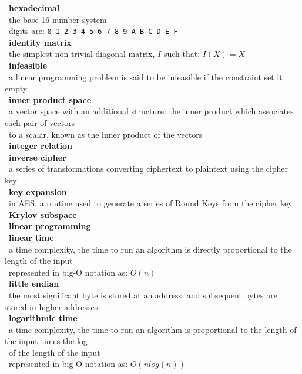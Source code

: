 \documentclass[10pt,letterpaper]{scrartcl}
\newcommand{\tbul}{\textbullet}
\newcommand{\tend}{\>\textendash}
\begin{document}
\begin{tabbing}
\tbul\ \textbf{hexadecimal} \\
    \tend\ the base-16 number system \\
    \tend\ digits are: \texttt{0 1 2 3 4 5 6 7 8 9 A B C D E F} \\
\tbul\ \textbf{identity matrix} \\
    \tend\ the simplest non-trivial diagonal matrix, $I$ such that: $I(X)=X$ \\
\tbul\ \textbf{infeasible} \\
    \tend\ a linear programming problem is said to be infeasible if the constraint set it empty \\
\tbul\ \textbf{inner product space} \\
    \tend\ a vector space with an additional structure: the inner product which associates each pair of vectors \\ \>\ to a scalar, known as the inner product of the vectors \\
\tbul\ \textbf{integer relation} \\
\tbul\ \textbf{inverse cipher} \\
    \tend\ a series of transformations converting ciphertext to plaintext using the cipher key \\
\tbul\ \textbf{key expansion} \\
    \tend\ in AES, a routine used to generate a series of Round Keys from the cipher key \\
\tbul\ \textbf{Krylov subspace} \\
\tbul\ \textbf{linear programming} \\ 
\tbul\ \textbf{linear time} \\
    \tend\ a time complexity, the time to run an algorithm is directly proportional to the length of the input \\
    \tend\ represented in big-O notation as: $O(n)$ \\
\tbul\ \textbf{little endian} \\
    \tend\ the most significant byte is stored at an address, and subsequent bytes are stored in higher addresses\\
\tbul\ \textbf{logarithmic time} \\
    \tend\ a time complexity, the time to run an algorithm is proportional to the length of the input times the log \\ \>\ of the length of the input \\
    \tend\ represented in big-O notation as: $O(nlog(n))$ \\

\end{tabbing}
\end{document}
